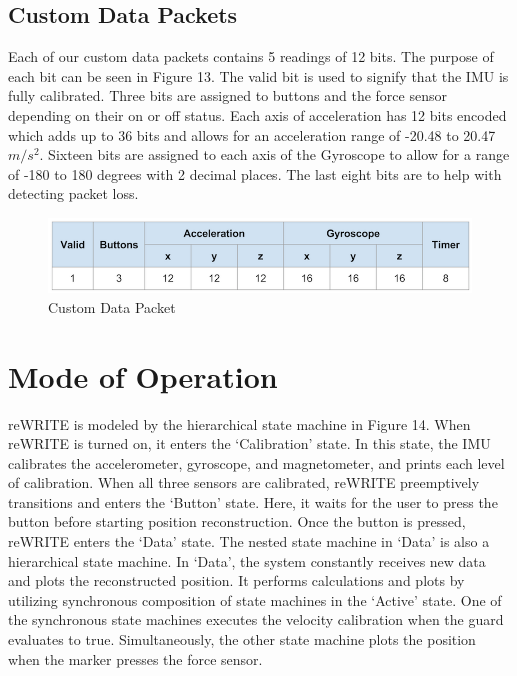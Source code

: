 \documentclass[10pt,journal]{IEEEtran}
\begin{document}
\subsection{Custom Data Packets}
Each of our custom data packets contains 5 readings of 12 bits. The purpose of each bit can be seen in Figure 13. The valid bit is used to signify that the IMU is fully calibrated. Three bits are assigned to buttons and the force sensor depending on their on or off status. Each axis of acceleration has 12 bits encoded which adds up to 36 bits and allows for an acceleration range of -20.48 to 20.47 $m/s^2$. Sixteen bits are assigned to each axis of the Gyroscope to allow for a range of -180 to 180 degrees with 2 decimal places. The last eight bits are to help with detecting packet loss.

\begin{figure}[h]
    \includegraphics[width=\linewidth]{figures/packet}
  		\caption{Custom Data Packet}
  	\label{fig:packet}
\end{figure}

\section{Mode of Operation}
reWRITE is modeled by the hierarchical state machine in Figure 14. When reWRITE is turned on, it enters the ‘Calibration’ state. In this state, the IMU calibrates the accelerometer, gyroscope, and magnetometer, and prints each level of calibration. When all three sensors are calibrated, reWRITE preemptively transitions and enters the ‘Button’ state. Here, it waits for the user to press the button before starting position reconstruction. Once the button is pressed, reWRITE enters the ‘Data’ state. The nested state machine in ‘Data’ is also a hierarchical state machine. In ‘Data’, the system constantly receives new data and plots the reconstructed position. It performs calculations and plots by utilizing synchronous composition of state machines in the ‘Active’ state. One of the synchronous state machines executes the velocity calibration when the guard evaluates to true. Simultaneously, the other state machine plots the position when the marker presses the force sensor.
\end{document}
